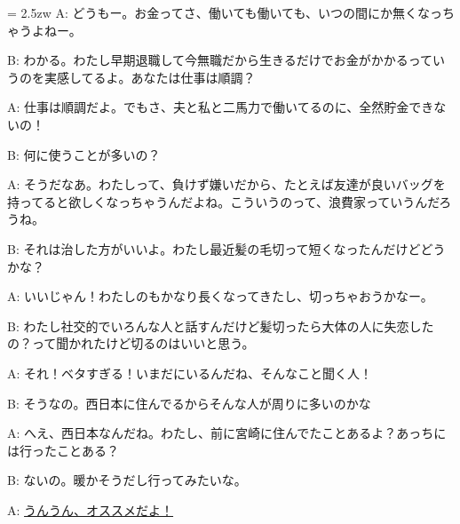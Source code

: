 \documentclass[11pt]{amsart}
\title{}
\author{}
\newenvironment{hangall}[1]{\hangindent = 2.5zw\everypar{\hangindent = 2.5zw}}{}
\begin{document}
\maketitle
\begin{hangall}{}%
A: どうもー。お金ってさ、働いても働いても、いつの間にか無くなっちゃうよねー。

B: わかる。わたし早期退職して今無職だから生きるだけでお金がかかるっていうのを実感してるよ。あなたは仕事は順調？

A: 仕事は順調だよ。でもさ、夫と私と二馬力で働いてるのに、全然貯金できないの！

B: 何に使うことが多いの？

A: そうだなあ。わたしって、負けず嫌いだから、たとえば友達が良いバッグを持ってると欲しくなっちゃうんだよね。こういうのって、浪費家っていうんだろうね。

B: それは治した方がいいよ。わたし最近髪の毛切って短くなったんだけどどうかな？

A: いいじゃん！わたしのもかなり長くなってきたし、切っちゃおうかなー。

B: わたし社交的でいろんな人と話すんだけど髪切ったら大体の人に失恋したの？って聞かれたけど切るのはいいと思う。

A: それ！ベタすぎる！いまだにいるんだね、そんなこと聞く人！

B: そうなの。西日本に住んでるからそんな人が周りに多いのかな

A: へえ、西日本なんだね。わたし、前に宮崎に住んでたことあるよ？あっちには行ったことある？

B: ないの。暖かそうだし行ってみたいな。

A: \ul{うんうん、オススメだよ！}\end{hangall}
\end{document}
